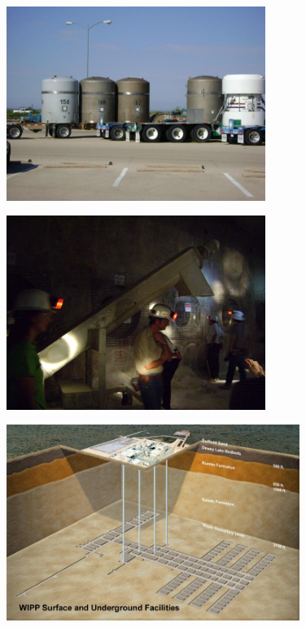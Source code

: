 \documentclass[aspectratio=1610,pdftex,dvipsnames,compress,xcolor={dvipsnames}]{beamer}
\begin{document}
\begin{frame}{}
    \begin{figure}
        \centering
        \includegraphics[width=0.75\textwidth]{wipp7.jpg}
    \end{figure}
\end{frame}


\begin{frame}{}
    \begin{figure}
        \centering
        \includegraphics[width=0.75\textwidth]{wipp8.jpg}
    \end{figure}
\end{frame}


\begin{frame}{}
    \begin{figure}
        \centering
        \includegraphics[width=0.85\textwidth]{wipp.jpg}
    \end{figure}
\end{frame}
\end{document}
